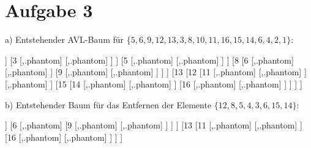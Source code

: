 \section*{Aufgabe 3}
a) Entstehender AVL-Baum für $\{ 5, 6, 9, 12, 13, 3, 8, 10, 11, 16, 15, 14, 6, 4, 2, 1 \}$: \\[0.5cm]

\begin{center}
	\begin{forest}
		[10 [6 [4 [2 [1 [,.phantom] [,.phantom] ] [3 [,.phantom] [,.phantom] ] ] [5 [,.phantom] [,.phantom] ] ] [8 [6 [,.phantom] [,.phantom] ] [9 [,.phantom] [,.phantom] ] ] ] [13 [12 [11 [,.phantom] [,.phantom] ] [,.phantom] ] [15 [14 [,.phantom] [,.phantom] ] [16 [,.phantom] [,.phantom] ] ] ] ]
	\end{forest}
\end{center}

b) Entstehender Baum für das Entfernen der Elemente $\{ 12, 8, 5, 4, 3, 6, 15, 14  \}$: \\[0.5cm]

\begin{center}
	\begin{forest}
		[10 [2 [1 [,.phantom] [,.phantom] ] [6 [,.phantom] [9 [,.phantom] [,.phantom] ] ] ] [13 [11 [,.phantom] [,.phantom] ] [16 [,.phantom] [,.phantom] ] ] ]
	\end{forest}
\end{center}